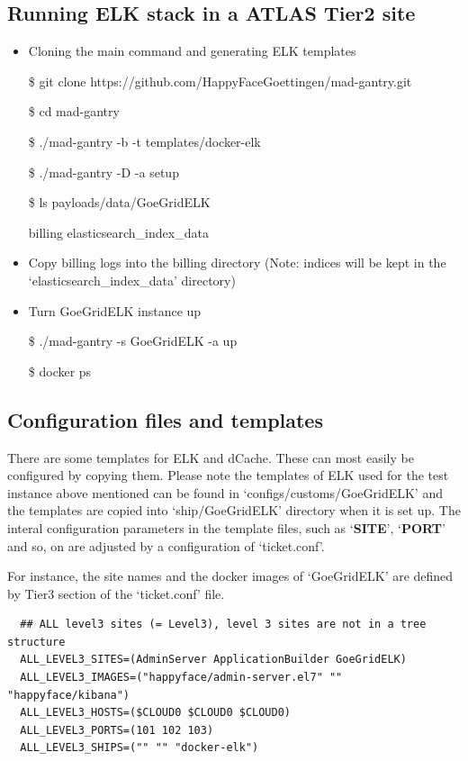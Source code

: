 \documentclass[]{article}
\begin{document}
\subsection{Running ELK stack in a ATLAS Tier2
site}\label{running-elk-stack-in-a-atlas-tier2-site}

\begin{itemize}
\item
  Cloning the main command and generating ELK templates

  \$ git clone https://github.com/HappyFaceGoettingen/mad-gantry.git

  \$ cd mad-gantry

  \$ ./mad-gantry -b -t templates/docker-elk

  \$ ./mad-gantry -D -a setup

  \$ ls payloads/data/GoeGridELK

  billing elasticsearch\_index\_data
\item
  Copy billing logs into the billing directory (Note: indices will be
  kept in the `elasticsearch\_index\_data' directory)
\item
  Turn GoeGridELK instance up

  \$ ./mad-gantry -s GoeGridELK -a up

  \$ docker ps
\end{itemize}

\subsection{Configuration files and
templates}\label{configuration-files-and-templates}

There are some templates for ELK and dCache. These can most easily be
configured by copying them. Please note the templates of ELK used for
the test instance above mentioned can be found in
`configs/customs/GoeGridELK' and the templates are copied into
`ship/GoeGridELK' directory when it is set up. The interal configuration
parameters in the template files, such as `\textbf{SITE}',
`\textbf{PORT}' and so, on are adjusted by a configuration of
`ticket.conf'.

For instance, the site names and the docker images of `GoeGridELK' are
defined by Tier3 section of the `ticket.conf' file.

\begin{verbatim}
  ## ALL level3 sites (= Level3), level 3 sites are not in a tree structure
  ALL_LEVEL3_SITES=(AdminServer ApplicationBuilder GoeGridELK)
  ALL_LEVEL3_IMAGES=("happyface/admin-server.el7" "" "happyface/kibana")
  ALL_LEVEL3_HOSTS=($CLOUD0 $CLOUD0 $CLOUD0)
  ALL_LEVEL3_PORTS=(101 102 103)
  ALL_LEVEL3_SHIPS=("" "" "docker-elk")
\end{verbatim}
\end{document}
